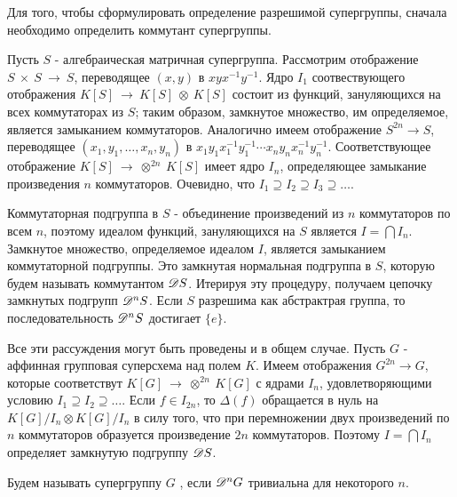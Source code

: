 Для того, чтобы сформулировать определение разрешимой супергруппы,
сначала необходимо определить коммутант супергруппы.

Пусть $ S $ - алгебраическая матричная супергруппа. Рассмотрим отображение
$ S ~\times ~S ~\to ~S $, переводящее $ (x, y) $ в $ xyx^{-1}y^{-1} $.
Ядро $ I_{1} $ соотвествующего отображения $ K[S] ~\to ~K[S] ~\otimes ~K[S] $ состоит из функций, зануляющихся на всех коммутаторах из $ S $;
таким образом, замкнутое множество, им определяемое, является замыканием коммутаторов. Аналогично имеем отображение $ S^{2n} \to S $, 
переводящее $ (x_1, y_1, \ldots, x_n, y_n) $ в 
$ x_1y_1x_1^{-1}y_1^{-1} \cdots x_ny_nx_n^{-1}y_n^{-1} $.
Соответствующее отображение $ K[S] ~\to ~\otimes^{2n} ~K[S] $ имеет ядро
$ I_n $, определяющее замыкание произведения $ n $ коммутаторов. 
Очевидно, что $ I_1 \supseteq I_2 \supseteq I_3 \supseteq \ldots $.

Коммутаторная подгруппа в $ S $ - объединение произведений из $ n $ 
коммутаторов по всем $ n $, поэтому идеалом функций, зануляющихся на $ S $ является $ I = \bigcap I_n $. Замкнутое множество, определяемое идеалом $ I $,
является замыканием коммутаторной подгруппы. Это замкнутая нормальная подгруппа в 
$ S $, которую будем называть коммутантом $ \mathscr{D} S $.
Итерируя эту процедуру, получаем цепочку замкнутых подгрупп $ \mathscr{D}^{n} S $. Если $ S $ разрешима как абстрактрая группа, 
то последовательность $ \mathscr{D}^{n} S $ достигает $ \{e\} $.


Все эти рассуждения могут быть проведены и в общем случае. Пусть $ G $ - аффинная групповая суперсхема над полем $ K $. Имеем отображения $ G^{2n} \to G $, которые соответствут $ K[G] ~\to ~\otimes^{2n} ~K[G] $ с ядрами $ I_n $, удовлетворяющими условию $ I_1 \supseteq I_2 \supseteq \ldots $. Если $ f \in I_{2n} $, 
то $ \Delta(f) $ обращается в нуль на $ K[G] / I_n \otimes K[G] / I_n $ в силу того, что при перемножении двух произведений по $ n $ коммутаторов образуется произведение $ 2n $ коммутаторов. Поэтому $ I = \bigcap I_n $ определяет замкнутую подгруппу $ \mathscr{D} S $.


Будем называть супергруппу $ G $ , если $ \mathscr{D}^{n} G $ тривиальна для некоторого $ n $.



\proof {
\qedhere
}

